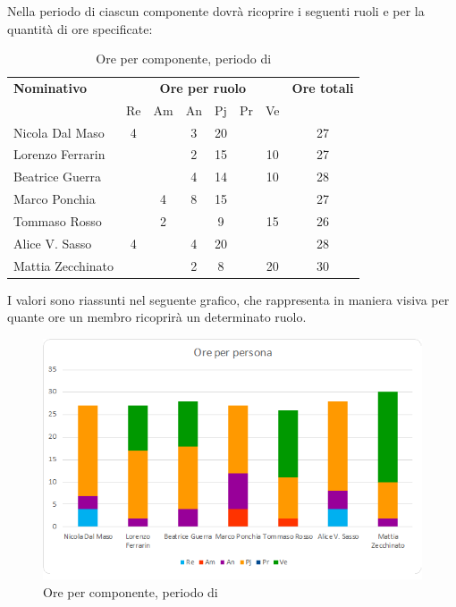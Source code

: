 \subsubsection{\PA}
Nella periodo di \PA{} ciascun componente dovrà ricoprire i seguenti ruoli e per la quantità di ore specificate:

\begin{table}[H]
	\centering
	\begin{tabular}{|l|c|c|c|c|c|c|c|}
		\hline
		\textbf{Nominativo} & 
		\multicolumn{6}{c|}{\textbf{Ore per ruolo}} & 
		\textbf{Ore totali} \\
		& Re & Am & An & Pj & Pr & Ve & \\
		\hline
		Nicola Dal Maso &4 & &3 &20 & & & 27 \\
		Lorenzo Ferrarin & & &2 &15 & &10 & 27 \\
		Beatrice Guerra & & &4 &14 & &10 & 28 \\
		Marco Ponchia & &4 &8 &15 & & & 27 \\
		Tommaso Rosso & &2 & &9 & &15 & 26 \\
		Alice V. Sasso &4 & &4 &20 & & & 28 \\
		Mattia Zecchinato & & &2 &8 & &20 & 30 \\
		\hline
	\end{tabular}
	\caption{Ore per componente, periodo di \PA{}}
\end{table}
I valori sono riassunti nel seguente grafico, che rappresenta in maniera visiva per quante ore un membro ricoprirà un determinato ruolo.
\begin{figure}[H]
	\centering
	\includegraphics[width=14cm]{img_suddlavoro/PA.png}
	\caption{Ore per componente, periodo di \PA{}}
\end{figure}

